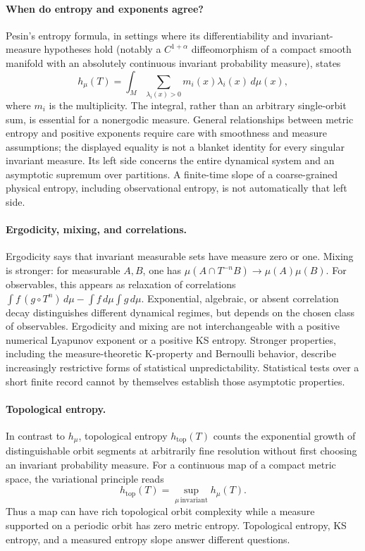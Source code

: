 \documentclass[11pt,a4paper]{article}
\begin{document}
\paragraph{When do entropy and exponents agree?} Pesin's entropy formula, in settings where its differentiability and invariant-measure hypotheses hold (notably a $C^{1+\alpha}$ diffeomorphism of a compact smooth manifold with an absolutely continuous invariant probability measure), states
\[h_\mu(T)=\int_M\sum_{\lambda_i(x)>0}m_i(x)\lambda_i(x)\,d\mu(x),\]
where $m_i$ is the multiplicity. The integral, rather than an arbitrary single-orbit sum, is essential for a nonergodic measure. General relationships between metric entropy and positive exponents require care with smoothness and measure assumptions; the displayed equality is not a blanket identity for every singular invariant measure. Its left side concerns the entire dynamical system and an asymptotic supremum over partitions. A finite-time slope of a coarse-grained physical entropy, including observational entropy, is not automatically that left side.

\paragraph{Ergodicity, mixing, and correlations.} Ergodicity says that invariant measurable sets have measure zero or one. Mixing is stronger: for measurable $A,B$, one has $\mu(A\cap T^{-n}B)\to\mu(A)\mu(B)$. For observables, this appears as relaxation of correlations $\int f\,(g\circ T^n)\,d\mu-\int f\,d\mu\int g\,d\mu$. Exponential, algebraic, or absent correlation decay distinguishes different dynamical regimes, but depends on the chosen class of observables. Ergodicity and mixing are not interchangeable with a positive numerical Lyapunov exponent or a positive KS entropy. Stronger properties, including the measure-theoretic K-property and Bernoulli behavior, describe increasingly restrictive forms of statistical unpredictability. Statistical tests over a short finite record cannot by themselves establish those asymptotic properties.

\paragraph{Topological entropy.} In contrast to $h_\mu$, topological entropy $h_{\mathrm{top}}(T)$ counts the exponential growth of distinguishable orbit segments at arbitrarily fine resolution without first choosing an invariant probability measure. For a continuous map of a compact metric space, the variational principle reads
\[h_{\mathrm{top}}(T)=\sup_{\mu\,\mathrm{invariant}}h_\mu(T).\]
Thus a map can have rich topological orbit complexity while a measure supported on a periodic orbit has zero metric entropy. Topological entropy, KS entropy, and a measured entropy slope answer different questions.
\end{document}

